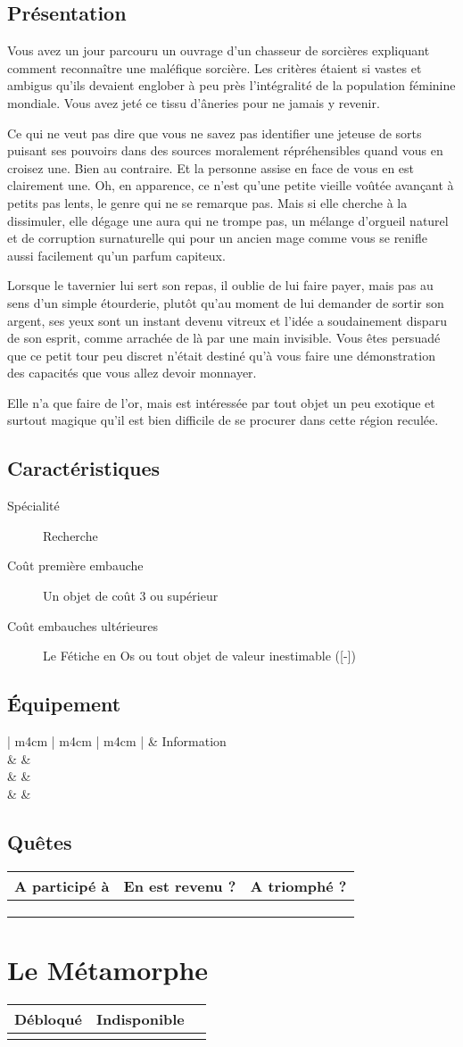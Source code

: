 \documentclass{report}
\newcommand{\unlockedhero}{
\begin{tabular}{ | m{4cm} | m{4cm} | m{4cm} | }
    \hline
    Débloqué & Indisponible\\
    \hline
    \mycheckedcheckbox & \mycheckbox \\
    \hline
\end{tabular}
}
\newcommand{\hero}[5]{
    \herostats{#1}{#2}{#3}{#4}

    \fullbleed{#5}

    \herosheet
}
\newcommand{\herostats}[4]{
    \section{Présentation}

    #1

    \section{Caractéristiques}

    \begin{description}
        \item[Spécialité] #2
        \item[Coût première embauche] #3
        \item[Coût embauches ultérieures] #4
    \end{description}
}
\newcommand{\herosheet}{
    \section{Équipement}

    \begin{tabular}{ | m{4cm} | m{4cm} | m{4cm} | }
        \hline
        \multicolumn{2}{| m{8cm} |}{Équipement} & Information\\
        \hline
        \mytextfield{4cm} & \mytextfield{4cm} & \mytextfield{4cm}\\
        \hline
        \mytextfield{4cm} & \mytextfield{4cm} & \mytextfield{4cm}\\
        \hline
        \mytextfield{4cm} & \mytextfield{4cm} & \mytextfield{4cm}\\
        \hline
    \end{tabular}

    \section{Quêtes}

    \begin{tabular}{ | m{7cm} | m{2.5cm} | m{2.5cm} |}
        \hline
        A participé à & En est revenu ? & A triomphé ?\\
        \hline
        \mytextfield{7cm} & \mycheckbox & \mycheckbox \\ 
        \hline
        \mytextfield{7cm} & \mycheckbox & \mycheckbox \\ 
        \hline
        \mytextfield{7cm} & \mycheckbox & \mycheckbox \\ 
        \hline
    \end{tabular}
}
\begin{document}
\hero{
Vous avez un jour parcouru un ouvrage d'un chasseur de sorcières expliquant comment reconnaître une maléfique sorcière. Les critères étaient si vastes et ambigus qu'ils devaient englober à peu près l'intégralité de la population féminine mondiale. Vous avez jeté ce tissu d'âneries pour ne jamais y revenir.

Ce qui ne veut pas dire que vous ne savez pas identifier une jeteuse de sorts puisant ses pouvoirs dans des sources moralement répréhensibles quand vous en croisez une. Bien au contraire. Et la personne assise en face de vous en est clairement une. Oh, en apparence, ce n'est qu'une petite vieille voûtée avançant à petits pas lents, le genre qui ne se remarque pas. Mais si elle cherche à la dissimuler, elle dégage une aura qui ne trompe pas, un mélange d'orgueil naturel et de corruption surnaturelle qui pour un ancien mage comme vous se renifle aussi facilement qu'un parfum capiteux.

Lorsque le tavernier lui sert son repas, il oublie de lui faire payer, mais pas au sens d'un simple étourderie, plutôt qu'au moment de lui demander de sortir son argent, ses yeux sont un instant devenu vitreux et l'idée a soudainement disparu de son esprit, comme arrachée de là par une main invisible. Vous êtes persuadé que ce petit tour peu discret n'était destiné qu'à vous faire une démonstration des capacités que vous allez devoir monnayer.

Elle n'a que faire de l'or, mais est intéressée par tout objet un peu exotique et surtout magique qu'il est bien difficile de se procurer dans cette région reculée.
}{
Recherche
}{
Un objet de coût 3 ou supérieur
}{
Le Fétiche en Os ou tout objet de valeur inestimable ([-])
}{images/witch.jpg}

\chapter{Le Métamorphe}

\unlockedhero
\end{document}

